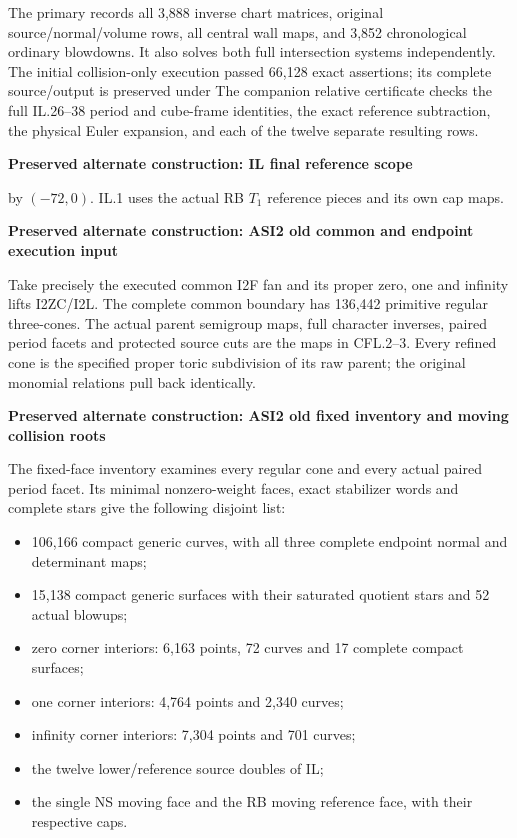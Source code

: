 The primary 
records all 3,888 inverse chart matrices, original
source/normal/volume rows, all central wall maps, and
3,852 chronological ordinary blowdowns. It also solves
both full intersection systems independently. The initial
collision-only execution passed 66,128 exact assertions;
its complete source/output is preserved under
The companion relative certificate checks the full
IL.26--38 period and cube-frame identities, the exact
reference subtraction, the physical Euler expansion,
and each of the twelve separate resulting rows.



\par\bigskip\noindent\textbf{Preserved alternate construction: IL final reference scope}\par
by \((-72,0)\). IL.1 uses the actual RB \(T_1\)
reference pieces and its own cap maps.

\par\bigskip\noindent\textbf{Preserved alternate construction: ASI2 old common and endpoint execution input}\par
Take precisely the executed common I2F fan and its proper zero,
one and infinity lifts I2ZC/I2L. The complete common boundary has
136,442 primitive regular three-cones. The actual parent semigroup
maps, full character inverses, paired period facets and protected
source cuts are the maps in CFL.2--3. Every refined cone is the
specified proper toric subdivision of its raw parent; the original
monomial relations pull back identically. 

\par\bigskip\noindent\textbf{Preserved alternate construction: ASI2 old fixed inventory and moving collision roots}\par
The fixed-face inventory examines every regular
cone and every actual paired period facet. Its
minimal nonzero-weight faces, exact stabilizer
words and complete stars give the following
disjoint list:

\begin{itemize}

\item
  106,166 compact generic curves, with all three
  complete endpoint normal and determinant maps;
\item
  15,138 compact generic surfaces with their
  saturated quotient stars and 52 actual blowups;
\item
  zero corner interiors: 6,163 points, 72 curves
  and 17 complete compact surfaces;
\item
  one corner interiors: 4,764 points and 2,340 curves;
\item
  infinity corner interiors: 7,304 points and 701 curves;
\item
  the twelve lower/reference source doubles of IL;
\item
  the single NS moving face and the RB moving
  reference face, with their respective caps.
\end{itemize}

